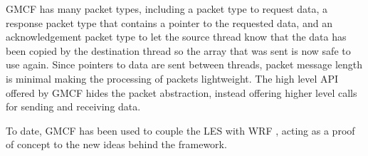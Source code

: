 GMCF has many packet types, including a packet type to request data, a response
packet type that contains a pointer to the requested data, and an
acknowledgement packet type to let the source thread know that the data has been
copied by the destination thread so the array that was sent is now safe to use
again. Since pointers to data are sent between threads, packet message length is
minimal making the processing of packets lightweight. The high level API offered
by GMCF hides the packet abstraction, instead offering higher level calls for
sending and receiving data.

To date, GMCF has been used to couple the LES with WRF
\cite{Vanderbauwhede2015}, acting as a proof of concept to the new ideas behind
the framework.
